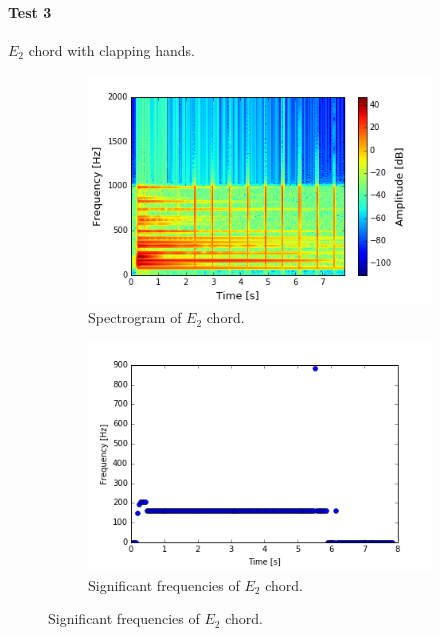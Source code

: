 \paragraph{Test 3} $E_2$ chord with clapping hands.
\begin{figure}[H]
\centering
\begin{subfigure}{0.49\textwidth}
\centering
\includegraphics[width=\textwidth]{figures/validation/systemtest/final_spec3.png}
\caption{Spectrogram of $E_2$ chord.}
\label{fig:final_spec2}
\end{subfigure}
\begin{subfigure}{0.49\textwidth}
\centering
\includegraphics[width=\textwidth]{figures/validation/systemtest/final_peak3.png}
\caption{Significant frequencies of $E_2$ chord.}
\label{fig:final_peak2}
\end{subfigure}
\caption{Significant frequencies of $E_2$ chord.}
\label{fig:final_2}
\end{figure}

